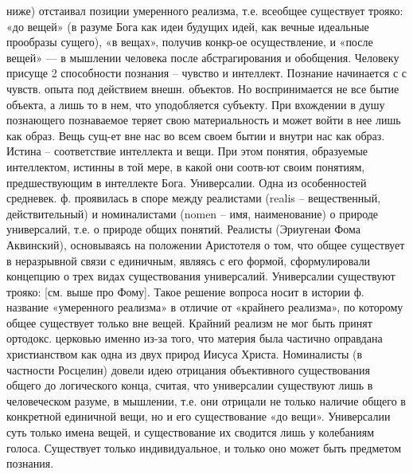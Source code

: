\documentclass[12pt]{article}
\begin{document}
ниже) отстаивал позиции умеренного реализма, т.е. всеобщее существует трояко: «до вещей» (в разуме Бога как
идеи будущих идей, как вечные идеальные прообразы сущего), «в вещах», получив конкр-ое осуществление, и
«после вещей» — в мышлении человека после абстрагирования и обобщения. Человеку присуще 2 способности
познания – чувство и интеллект. Познание начинается с с чувств. опыта под действием внешн. объектов. Но
воспринимается не все бытие объекта, а лишь то в нем, что уподобляется субъекту. При вхождении в душу
познающего познаваемое теряет свою материальность и может войти в нее лишь как образ. Вещь сущ-ет вне
нас во всем своем бытии и внутри нас как образ.
Истина – соответствие интеллекта и вещи. При этом понятия, образуемые интеллектом, истинны в той мере, в
какой они соотв-ют своим понятиям, предшествующим в интеллекте Бога.
Универсалии. Одна из особенностей средневек. ф. проявилась в споре между реалистами (realis –
вещественный, действительный) и номиналистами (nomen – имя, наименование) о природе универсалий, т.е. о
природе общих понятий. Реалисты (Эриугенаи Фома Аквинский), основываясь на положении Аристотеля о том,
что общее существует в неразрывной связи с единичным, являясь с его формой, сформулировали концепцию о
трех видах существования универсалий. Универсалии существуют трояко: [см. выше про Фому]. Такое решение 
вопроса носит в истории ф. название «умеренного реализма» в отличие от «крайнего реализма», по которому
общее существует только вне вещей. Крайний реализм не мог быть принят ортодокс. церковью именно из-за
того, что материя была частично оправдана христианством как одна из двух природ Иисуса Христа.
Номиналисты (в частности Росцелин) довели идею отрицания объективного существования общего до
логического конца, считая, что универсалии существуют лишь в человеческом разуме, в мышлении, т.е. они
отрицали не только наличие общего в конкретной единичной вещи, но и его существование «до вещи».
Универсалии суть только имена вещей, и существование их сводится лишь у колебаниям голоса. Существует
только индивидуальное, и только оно может быть предметом познания.

\newpage
\end{document}
